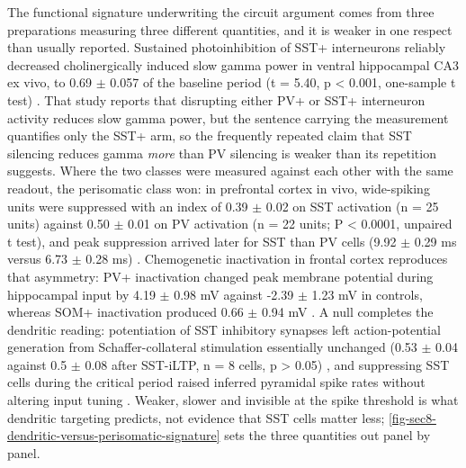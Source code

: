 \documentclass[11pt]{article}
\begin{document}
The functional signature underwriting the circuit argument comes from three preparations measuring three different quantities, and it is weaker in one respect than usually reported. Sustained photoinhibition of SST+ interneurons reliably decreased cholinergically induced slow gamma power in ventral hippocampal CA3 ex vivo, to 0.69 $\pm$ 0.057 of the baseline period (t = 5.40, p < 0.001, one-sample t test) \citep{Antonoudiou2020}. That study reports that disrupting either PV+ or SST+ interneuron activity reduces slow gamma power, but the sentence carrying the measurement quantifies only the SST+ arm, so the frequently repeated claim that SST silencing reduces gamma \emph{more} than PV silencing is weaker than its repetition suggests. Where the two classes were measured against each other with the same readout, the perisomatic class won: in prefrontal cortex in vivo, wide-spiking units were suppressed with an index of 0.39 $\pm$ 0.02 on SST activation (n = 25 units) against 0.50 $\pm$ 0.01 on PV activation (n = 22 units; P < 0.0001, unpaired t test), and peak suppression arrived later for SST than PV cells (9.92 $\pm$ 0.29 ms versus 6.73 $\pm$ 0.28 ms) \citep{Liu2020b}. Chemogenetic inactivation in frontal cortex reproduces that asymmetry: PV+ inactivation changed peak membrane potential during hippocampal input by 4.19 $\pm$ 0.98 mV against -2.39 $\pm$ 1.23 mV in controls, whereas SOM+ inactivation produced 0.66 $\pm$ 0.94 mV \citep{Zhang2024b}. A null completes the dendritic reading: potentiation of SST inhibitory synapses left action-potential generation from Schaffer-collateral stimulation essentially unchanged (0.53 $\pm$ 0.04 against 0.5 $\pm$ 0.08 after SST-iLTP, n = 8 cells, p > 0.05) \citep{Udakis2020}, and suppressing SST cells during the critical period raised inferred pyramidal spike rates without altering input tuning \citep{Yaeger2019}. Weaker, slower and invisible at the spike threshold is what dendritic targeting predicts, not evidence that SST cells matter less; \ref{fig-sec8-dendritic-versus-perisomatic-signature} sets the three quantities out panel by panel.
\end{document}

